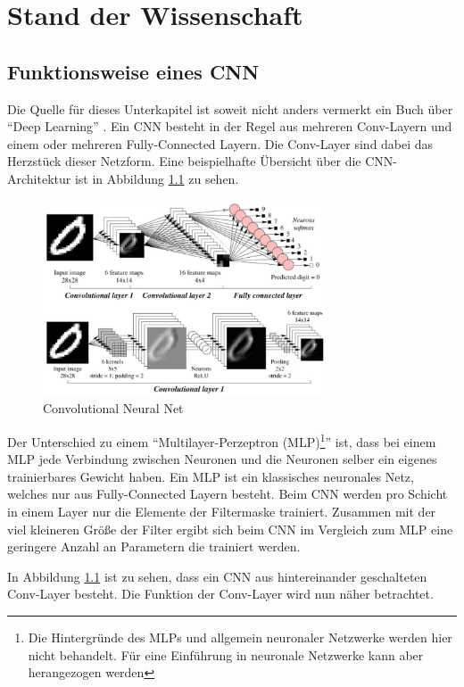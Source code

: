 \chapter{Stand der Wissenschaft}

\section{Funktionsweise eines CNN}\label{sec:conv}
Die Quelle für dieses Unterkapitel ist soweit nicht anders vermerkt ein Buch über \enquote{Deep Learning} \cite{CNNBook}.
Ein CNN besteht in der Regel aus mehreren Conv-Layern und einem oder mehreren Fully-Connected Layern. Die Conv-Layer sind dabei das Herzstück dieser Netzform. Eine beispielhafte Übersicht über die CNN-Architektur ist in Abbildung \ref{fig:cnn} zu sehen.


\begin{figure}[h]
  \centering
  \includegraphics[width=0.75\textwidth]{images/cnn.pdf}
  \caption{Convolutional Neural Net \cite{CNNImg}}
  \label{fig:cnn}
\end{figure}


Der Unterschied zu einem \enquote{Multilayer-Perzeptron (MLP)\footnote{Die Hintergründe des MLPs und allgemein neuronaler Netzwerke werden hier nicht behandelt. Für eine Einführung in neuronale Netzwerke kann aber \cite{neural} herangezogen werden}} ist, dass bei einem MLP jede Verbindung zwischen Neuronen und die Neuronen selber ein eigenes trainierbares Gewicht haben. Ein MLP ist ein klassisches neuronales Netz, welches nur aus Fully-Connected Layern besteht. Beim CNN werden pro Schicht in einem Layer nur die Elemente der Filtermaske trainiert. Zusammen mit der viel kleineren Größe der Filter ergibt sich beim CNN im Vergleich zum MLP eine geringere Anzahl an Parametern die trainiert werden.

In Abbildung \ref{fig:cnn} ist zu sehen, dass ein CNN aus hintereinander geschalteten Conv-Layer besteht. Die Funktion der Conv-Layer wird nun näher betrachtet.

